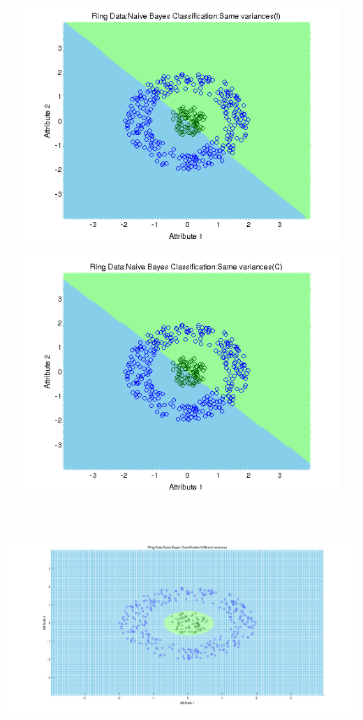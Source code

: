 \documentclass[a4paper]{article}
\begin{document}
		\centerline{\includegraphics[width=160mm,height=90mm]{plots/naivebayes/nls/ring/identity_var.png}}
		\centerline{\includegraphics[width=160mm,height=90mm]{plots/naivebayes/nls/ring/same_var.png}}
		\centerline{\includegraphics[width=160mm,height=90mm]{plots/naivebayes/nls/ring/diff_var.png}}
\end{document}
